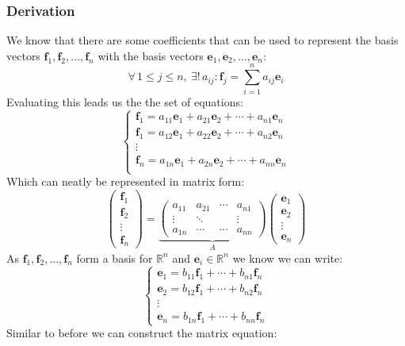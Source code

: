 \documentclass[12pt]{article}
\newcommand{\arbvec}[2]{\ensuremath{\textbf{#1}_1,\textbf{#1}_2,\dots,\textbf{#1}_{#2}}}
\begin{document}
\subsubsection*{Derivation}
We know that there are some coefficients that can be used to represent the basis vectors \(\arbvec{f}{n}\) with the basis vectors \(\arbvec{e}{n}\):
\[\forall\,1\leq j\leq n,\ \exists!\,a_{ij}:\textbf{f}_j=\sum^n_{i=1}a_{ij}\textbf{e}_i\]
Evaluating this leads us the the set of equations:
\[\begin{cases}
    \textbf{f}_1=a_{11}\textbf{e}_1+a_{21}\textbf{e}_2+\cdots+a_{n1}\textbf{e}_n \\
    \textbf{f}_1=a_{12}\textbf{e}_1+a_{22}\textbf{e}_2+\cdots+a_{n2}\textbf{e}_n \\
    \vdots \\
    \textbf{f}_n=a_{1n}\textbf{e}_1+a_{2n}\textbf{e}_2+\cdots+a_{nn}\textbf{e}_n \\
\end{cases}\]
Which can neatly be represented in matrix form:
\[\begin{pmatrix}
    \textbf{f}_1 \\
    \textbf{f}_2 \\
    \vdots \\
    \textbf{f}_n
\end{pmatrix}=\underbrace{\begin{pmatrix}
    a_{11} & a_{21} & \cdots & a_{n1} \\
    \vdots & \ddots &  & \vdots \\
    a_{1n} & \cdots & \cdots & a_{nn}
\end{pmatrix}}_{A}\begin{pmatrix}
    \textbf{e}_1 \\
    \textbf{e}_2 \\
    \vdots \\
    \textbf{e}_n
\end{pmatrix}\]
As \(\arbvec{f}{n}\) form a basis for \(\mathbb{R}^n\) and \(\textbf{e}_i\in\mathbb{R}^n\) we know we can write:
\[\begin{cases}
    \textbf{e}_1=b_{11}\textbf{f}_1+\cdots+b_{n1}\textbf{f}_n \\
    \textbf{e}_2=b_{12}\textbf{f}_1+\cdots+b_{n2}\textbf{f}_n \\
    \vdots \\
    \textbf{e}_n=b_{1n}\textbf{f}_1+\cdots+b_{nn}\textbf{f}_n
\end{cases}\]
Similar to before we can construct the matrix equation:
\end{document}
